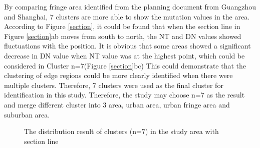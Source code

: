 By comparing fringe area identified from the planning document from Guangzhou and Shanghai, 7 clusters are more able to show the mutation values in the area. According to Figure \ref{section}, it could be found that when the section line in Figure \ref{section}ab moves from south to north, the NT and DN values showed fluctuations with the position. It is obvious that some areas showed a significant decrease in DN value when NT value was at the highest point, which could be considered in Cluster n=7(Figure \ref{section}bc) This could demonstrate that the clustering of edge regions could be more clearly identified when there were multiple clusters. Therefore, 7 clusters were used as the final cluster for identification in this study. Therefore, the study may choose n=7 as the result and merge different cluster into 3 area, urban area, urban fringe area and suburban area.\\

\begin{figure}[h]
\centering
{}
\quad
{}

\caption{The distribution result of clusters (n=7) in the study area with section line}
\label{cluster7}
\end{figure}

